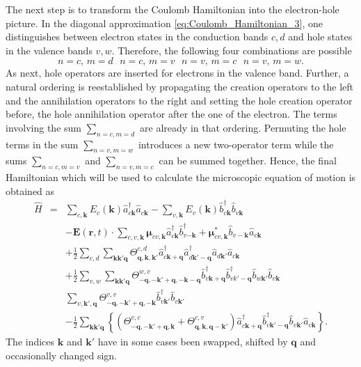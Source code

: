 The next step is to transform the Coulomb Hamiltonian into the electron-hole
picture. In the diagonal approximation \ref{eq:Coulomb_Hamiltonian_3},
one distinguishes between electron states in the conduction bands
$c,d$ and hole states in the valence bands $v,w$. Therefore, the
following four combinations are possible\begin{equation}
n=c,\, m=d\,\,\,\, n=c,\, m=v\,\,\,\, n=v,\, m=c\,\,\,\, n=v,\, m=w.\end{equation}
As next, hole operators are inserted for electrons in the valence
band. Further, a natural ordering is reestablished by propagating
the creation operators to the left and the annihilation operators
to the right and setting the hole creation operator before, the hole
annihilation operator after the one of the electron. The terms involving
the sum $\sum_{n=c,m=d}$ are already in that ordering. Permuting
the hole terms in the sum $\sum_{n=v,m=w}$ introduces a new two-operator
term while the sums $\sum_{n=c,m=v}$ and $\sum_{n=v,m=c}$ can be
summed together. Hence, the final Hamiltonian which will be used to
calculate the microscopic equation of motion is obtained as\begin{eqnarray}
\hat{H} & = & \sum_{c,\mathbf{k}}E_{c}(\mathbf{k})\hat{a}_{c\mathbf{k}}^{\dagger}\hat{a}_{c\mathbf{k}}-\sum_{v,\mathbf{k}}E_{v}(\mathbf{k})\hat{b}_{v\mathbf{k}}^{\dagger}\hat{b}_{v\mathbf{k}}\label{eq:Full_H_1-1}\\
 &  & -\mathbf{E}(\mathbf{r},t)\cdot\sum_{c,v,\mathbf{k}}\boldsymbol{\mu}_{cv,\mathbf{k}}\hat{a}_{c\mathbf{k}}^{\dagger}\hat{b}_{v\mathbf{-k}}^{\dagger}+\boldsymbol{\mu}_{cv,\mathbf{k}}^{*}\hat{b}_{v-\mathbf{k}}\hat{a}_{c\mathbf{k}}\label{eq:Full_H_2}\\
 &  & +\frac{1}{2}\sum_{c,d}\sum_{\mathbf{k}\mathbf{k}'\mathbf{q}}\Theta_{\mathbf{q},\mathbf{k},\mathbf{k}'}^{c,d}\hat{a}_{c\mathbf{k}+\mathbf{q}}^{\dagger}\hat{a}_{d\mathbf{k}'-\mathbf{q}}^{\dagger}\hat{a}_{d\mathbf{k}'}\hat{a}_{c\mathbf{k}}\label{eq:Full_H_3}\\
 &  & +\frac{1}{2}\sum_{v,w}\sum_{\mathbf{k}\mathbf{k}'\mathbf{q}}\Theta_{-\mathbf{q},-\mathbf{k}'+\mathbf{q},-\mathbf{k}-\mathbf{q}}^{w,v}\hat{b}_{v\mathbf{k}+\mathbf{q}}^{\dagger}\hat{b}_{vk'-\mathbf{q}}^{\dagger}\hat{b}_{w\mathbf{k}'}\hat{b}_{v\mathbf{k}}\label{eq:Full_H_4}\\
 &  & \sum_{v,\mathbf{k}',\mathbf{q}}\Theta_{-\mathbf{q},-\mathbf{k}'+\mathbf{q},-\mathbf{k}}^{v,v}\hat{b}_{v\mathbf{k}'}^{\dagger}\hat{b}_{v\mathbf{k}'}\label{eq:Full_H_5}\\
 &  & -\frac{1}{2}\sum_{\mathbf{k}\mathbf{k}'\mathbf{q}}\left\{ \left(\Theta_{-\mathbf{q},-\mathbf{k}'+\mathbf{q},\mathbf{k}}^{v,c}+\Theta_{\mathbf{q},\mathbf{k},\mathbf{q}-\mathbf{k}'}^{c,v}\right)\hat{a}_{c\mathbf{k}+\mathbf{q}}^{\dagger}\hat{b}_{v\mathbf{k}'-\mathbf{q}}^{\dagger}\hat{b}_{v\mathbf{k}'}\hat{a}_{c\mathbf{k}}\right\} .\label{eq:Full_H_6}\end{eqnarray}
The indices $\mathbf{k}$ and $\mathbf{k}'$ have in some cases been
swapped, shifted by $\mathbf{q}$ and occasionally changed sign.


